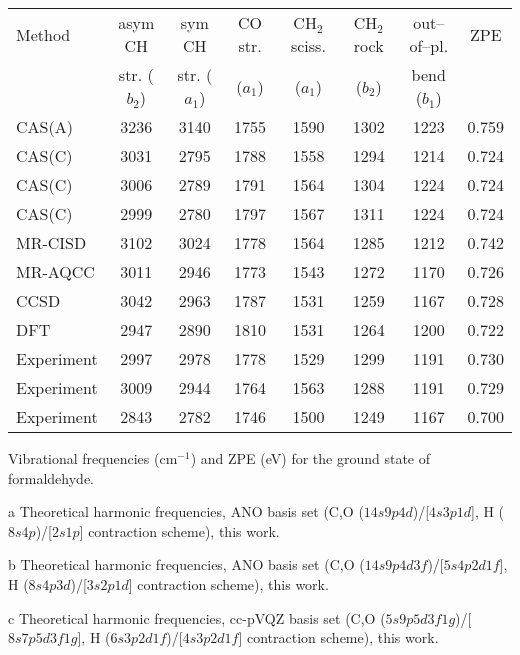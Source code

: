 \begin{center}
\begin{threeparttable}
\footnotesize
\begin{tabular*}{\textwidth}{l@{\hspace*{1mm}}ccccccc}
\hline
Method &  asym CH        & sym CH         & CO str. & CH$_2$ sciss.&CH$_2$ rock &
out--of--pl. & ZPE \\
       & str. ($b_2$) & str. ($a_1$)&  ($a_1$)   &  ($a_1$)      &  ($b_2$)   &
bend  ($b_1$)&     \\
\hline
CAS(A)\tnote{a}
       & 3236  & 3140  & 1755  & 1590  & 1302  & 1223  & 0.759 \\
CAS(C)\tnote{a}
       & 3031  & 2795  & 1788  & 1558  & 1294  & 1214  & 0.724 \\
CAS(C)\tnote{b}
       & 3006  & 2789  & 1791  & 1564  & 1304  & 1224  & 0.724 \\
CAS(C)\tnote{c}
       & 2999  & 2780  & 1797  & 1567  & 1311  & 1224  & 0.724 \\
MR-CISD\tnote{d}
       & 3102  & 3024  & 1778  & 1564  & 1285  & 1212  & 0.742 \\
MR-AQCC\tnote{d}
       & 3011  & 2946  & 1773  & 1543  & 1272  & 1170  & 0.726 \\
CCSD\tnote{e}
       & 3042  & 2963  & 1787  & 1531  & 1259  & 1167  & 0.728 \\
DFT\tnote{f}
       & 2947  & 2890  & 1810  & 1531  & 1264  & 1200  & 0.722 \\
Experiment\tnote{g}
       & 2997 &  2978  & 1778  & 1529  & 1299  & 1191  & 0.730 \\
Experiment\tnote{h}
       & 3009  & 2944  & 1764  & 1563  & 1288  & 1191  & 0.729 \\
Experiment\tnote{i}\tnote{j}
       & 2843  & 2782  & 1746  & 1500  & 1249  & 1167  & 0.700 \\
\hline
\end{tabular*}
\caption{\footnotesize Vibrational frequencies (cm$^{-1}$) and ZPE (eV)
for the ground state of formaldehyde.
}\label{tbl:vibra_form}
\begin{tablenotes}
\footnotesize
\item[a] Theoretical harmonic frequencies, ANO basis set (C,O ($14s9p4d$)/[$4s3p1d$], H ($8s4p$)/[$2s1p$] contraction scheme), this work.
\item[b] Theoretical harmonic frequencies, ANO basis set (C,O ($14s9p4d3f$)/[$5s4p2d1f$], H ($8s4p3d$)/[$3s2p1d$] contraction scheme), this work.
\item[c] Theoretical harmonic frequencies, cc-pVQZ basis set (C,O ($5s9p5d3f1g$)/[$8s7p5d3f1g$], H ($6s3p2d1f$)/[$4s3p2d1f$] contraction scheme), this work.

\end{tablenotes}
\end{threeparttable}
\end{center}
